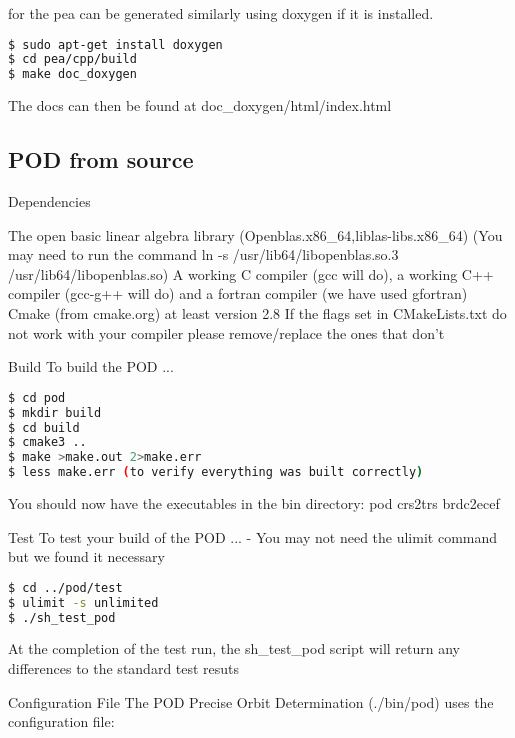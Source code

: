  for the pea can be generated similarly using doxygen if it is installed.

\begin{lstlisting}[language=bash]
$ sudo apt-get install doxygen
$ cd pea/cpp/build
$ make doc_doxygen
\end{lstlisting}
The docs can then be found at doc\_doxygen/html/index.html

\subsection{POD from source}



Dependencies

The open basic linear algebra library (Openblas.x86\_64,liblas-libs.x86\_64) (You may need to run the command ln -s /usr/lib64/libopenblas.so.3 /usr/lib64/libopenblas.so)
A working C compiler (gcc will do), a working C++ compiler (gcc-g++ will do) and a fortran compiler (we have used gfortran)
Cmake (from cmake.org) at least version 2.8
If the flags set in CMakeLists.txt do not work with your compiler please remove/replace the ones that don't

Build
To build the POD ...
\begin{lstlisting}[language=bash]
$ cd pod
$ mkdir build
$ cd build
$ cmake3 .. 
$ make >make.out 2>make.err
$ less make.err (to verify everything was built correctly)
\end{lstlisting}
You should now have the executables in the bin directory: pod crs2trs brdc2ecef

Test
To test your build of the POD ... - You may not need the ulimit command but we found it necessary

\begin{lstlisting}[language=bash]
$ cd ../pod/test
$ ulimit -s unlimited
$ ./sh_test_pod
\end{lstlisting}

At the completion of the test run, the sh\_test\_pod script will return any differences to the standard test resuts
    


Configuration File
The POD Precise Orbit Determination (./bin/pod) uses the configuration file: 


%
